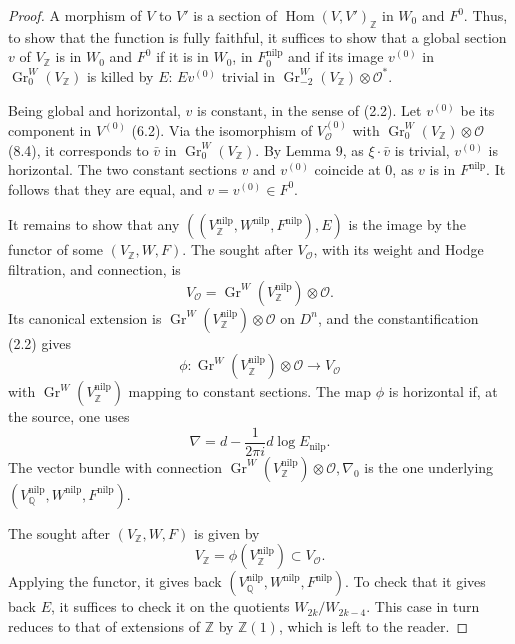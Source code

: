 \documentclass[11pt,a4paper]{article}
\theoremstyle{plain}
\theoremstyle{definition}
\DeclareMathOperator{\Hom}{Hom}
\DeclareMathOperator{\Gr}{Gr}
\begin{document}
\begin{proof}
A morphism of $V$ to $V'$ is a section of $\Hom(V, V')_{\mathbb{Z}}$ in $W_{0}$ and $F^{0}$. Thus, to show that the function is fully faithful, it suffices to show that a global section $v$ of $V_{\mathbb{Z}}$ is in $W_{0}$ and $F^{0}$ if it is in $W_{0}$, in $F^{\text{nilp}}_{0}$ and if its image $v^{(0)}$ in $\Gr_{0}^{W}(V_{\mathbb{Z}})$ is killed by $E$: $E v^{(0)}$ trivial in $\Gr_{-2}^{W}(V_{\mathbb{Z}}) \otimes \mathcal{O}^{*}$.

Being global and horizontal, $v$ is constant, in the sense of (2.2). Let $v^{(0)}$ be its component in $V^{(0)}$ (6.2). Via the isomorphism of $V_{\mathcal{O}}^{(0)}$ with $\Gr_{0}^{W}(V_{\mathbb{Z}}) \otimes \mathcal{O}$ (8.4), it corresponds to $\bar{v}$ in $\Gr_{0}^{W}(V_{\mathbb{Z}})$. By Lemma 9, as $\xi \cdot \bar{v}$ is trivial, $v^{(0)}$ is horizontal. The two constant sections $v$ and $v^{(0)}$ coincide at 0, as $v$ is in $F^{\text{nilp}}$. It follows that they are equal, and $v = v^{(0)} \in F^{0}$.

It remains to show that any $((V_{\mathbb{Z}}^{\text{nilp}}, W^{\text{nilp}}, F^{\text{nilp}}), E)$ is the image by the functor of some $(V_{\mathbb{Z}}, W, F)$. The sought after $V_{\mathcal{O}}$, with its weight and Hodge filtration, and connection, is
\[
V_{\mathcal{O}} = \Gr^{W}(V_{\mathbb{Z}}^{\text{nilp}}) \otimes \mathcal{O}.
\]
Its canonical extension is $\Gr^{W}(V_{\mathbb{Z}}^{\text{nilp}}) \otimes \mathcal{O}$ on $D^{n}$, and the constantification (2.2) gives
\[
\phi: \Gr^{W}(V_{\mathbb{Z}}^{\text{nilp}}) \otimes \mathcal{O} \to V_{\mathcal{O}}
\]
with $\Gr^{W}(V_{\mathbb{Z}}^{\text{nilp}})$ mapping to constant sections. The map $\phi$ is horizontal if, at the source, one uses
\[
\nabla = d - \frac{1}{2\pi i} d\log E_{\text{nilp}}.
\]
The vector bundle with connection $\Gr^{W}(V_{\mathbb{Z}}^{\text{nilp}}) \otimes \mathcal{O}, \nabla_{0}$ is the one underlying $(V_{\mathbb{Q}}^{\text{nilp}}, W^{\text{nilp}}, F^{\text{nilp}})$.

The sought after $(V_{\mathbb{Z}}, W, F)$ is given by
\[
V_{\mathbb{Z}} = \phi(V_{\mathbb{Z}}^{\text{nilp}}) \subset V_{\mathcal{O}}.
\]
Applying the functor, it gives back $(V_{\mathbb{Q}}^{\text{nilp}}, W^{\text{nilp}}, F^{\text{nilp}})$. To check that it gives back $E$, it suffices to check it on the quotients $W_{2k}/W_{2k-4}$. This case in turn reduces to that of extensions of $\mathbb{Z}$ by $\mathbb{Z}(1)$, which is left to the reader.
\end{proof}
\end{document}
